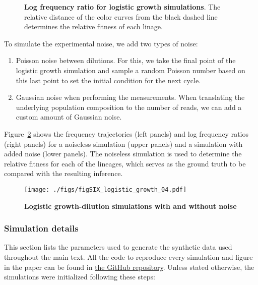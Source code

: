 \documentclass[
]{scrartcl}
\providecommand{\tightlist}{%
  \setlength{\itemsep}{0pt}\setlength{\parskip}{0pt}}\usepackage{longtable,booktabs,array}
\begin{document}
\begin{refsegment}
\begin{figure}
{}

\caption{\label{fig-SIX_logistic_growth_03}\textbf{Log frequency ratio
for logistic growth simulations}. The relative distance of the color
curves from the black dashed line determines the relative fitness of
each linage.}

\end{figure}

To simulate the experimental noise, we add two types of noise:

\begin{enumerate}
\def\labelenumi{\arabic{enumi}.}
\tightlist
\item
  Poisson noise between dilutions. For this, we take the final point of
  the logistic growth simulation and sample a random Poisson number
  based on this last point to set the initial condition for the next
  cycle.
\item
  Gaussian noise when performing the measurements. When translating the
  underlying population composition to the number of reads, we can add a
  custom amount of Gaussian noise.
\end{enumerate}

Figure~\ref{fig-SIX_logistic_growth_04} shows the frequency trajectories
(left panels) and log frequency ratios (right panels) for a noiseless
simulation (upper panels) and a simulation with added noise (lower
panels). The noiseless simulation is used to determine the relative
fitness for each of the lineages, which serves as the ground truth to be
compared with the resulting inference.

\begin{figure}

{\centering \texttt{[image: ./figs/figSIX\_logistic\_growth\_04.pdf]}

}

\caption{\label{fig-SIX_logistic_growth_04}\textbf{Logistic
growth-dilution simulations with and without noise}}

\end{figure}

\hypertarget{simulation-details}{%
\subsubsection{Simulation details}\label{simulation-details}}

This section lists the parameters used to generate the synthetic data
used throughout the main text. All the code to reproduce every
simulation and figure in the paper can be found in
\href{https://github.com/mrazomej/bayesian_fitness/tree/master}{the
GitHub repository}. Unless stated otherwise, the simulations were
initialized following these steps:


\end{refsegment}
\end{document}
